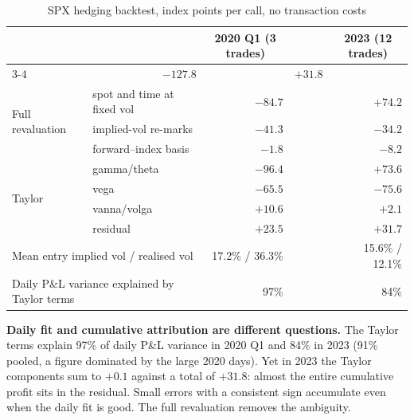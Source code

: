 \documentclass[10pt,letterpaper]{article}
\begin{document}
\begin{table}[H]
\caption{SPX hedging backtest, index points per call, no transaction costs}\label{tab:hedge}
\centering\small
\begin{tabular}{llrrrrr}
\toprule
& & \multicolumn{2}{c}{\textbf{2020 Q1 (3 trades)}} & & \multicolumn{2}{c}{\textbf{2023 (12 trades)}}\\
\cmidrule{3-4}\cmidrule{6-7}
\multicolumn{2}{l}{\textbf{Hedged P\&L}} & \multicolumn{2}{r}{$-127.8$} & & \multicolumn{2}{r}{$+31.8$}\\
\midrule
\multirow{3}{*}{Full revaluation} & spot and time at fixed vol & \multicolumn{2}{r}{$-84.7$} & & \multicolumn{2}{r}{$+74.2$}\\
& implied-vol re-marks & \multicolumn{2}{r}{$-41.3$} & & \multicolumn{2}{r}{$-34.2$}\\
& forward--index basis & \multicolumn{2}{r}{$-1.8$} & & \multicolumn{2}{r}{$-8.2$}\\
\midrule
\multirow{4}{*}{Taylor} & gamma/theta & \multicolumn{2}{r}{$-96.4$} & & \multicolumn{2}{r}{$+73.6$}\\
& vega & \multicolumn{2}{r}{$-65.5$} & & \multicolumn{2}{r}{$-75.6$}\\
& vanna/volga & \multicolumn{2}{r}{$+10.6$} & & \multicolumn{2}{r}{$+2.1$}\\
& residual & \multicolumn{2}{r}{$+23.5$} & & \multicolumn{2}{r}{$+31.7$}\\
\midrule
\multicolumn{2}{l}{Mean entry implied vol / realised vol} & \multicolumn{2}{r}{17.2\% / 36.3\%} & & \multicolumn{2}{r}{15.6\% / 12.1\%}\\
\multicolumn{2}{l}{Daily P\&L variance explained by Taylor terms} & \multicolumn{2}{r}{97\%} & & \multicolumn{2}{r}{84\%}\\
\bottomrule
\end{tabular}
\end{table}

\begin{callout}
\textbf{Daily fit and cumulative attribution are different questions.} The Taylor terms explain 97\% of daily P\&L variance
in 2020 Q1 and 84\% in 2023 (91\% pooled, a figure dominated by the large 2020 days). Yet in 2023 the Taylor components sum to
$+0.1$ against a total of $+31.8$: almost the entire cumulative profit sits in the residual. Small errors with a consistent
sign accumulate even when the daily fit is good. The full revaluation removes the ambiguity.
\end{callout}
\end{document}
